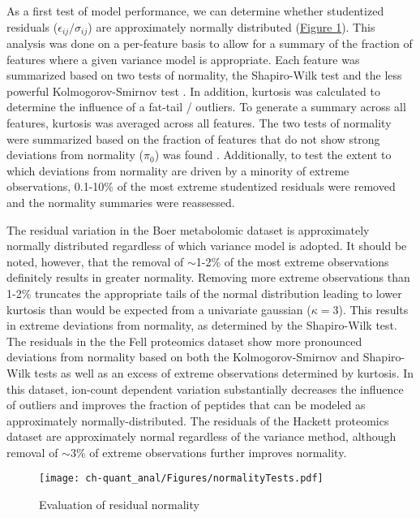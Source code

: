 As a first test of model performance, we can determine whether studentized residuals ($\epsilon_{ij} / \sigma_{ij}$) are approximately normally distributed (\hyperref[ch-quant_anal:normalityTests]{Figure \ref{ch-quant_anal:normalityTests}}). This analysis was done on a per-feature basis to allow for a summary of the fraction of features where a given variance model is appropriate. Each feature was summarized based on two tests of normality, the Shapiro-Wilk test \cite{Shapiro:1965gf} and the less powerful Kolmogorov-Smirnov test \cite{Lilliefors:1967bh}. In addition, kurtosis was calculated to determine the influence of a fat-tail / outliers. To generate a summary across all features, kurtosis was averaged across all features. The two tests of normality were summarized based on the fraction of features that do not show strong deviations from normality ($\pi_{0}$) was found \cite{Storey:2003cj}. Additionally, to test the extent to which deviations from normality are driven by a minority of extreme observations, 0.1-10\% of the most extreme studentized residuals were removed and the normality summaries were reassessed.

The residual variation in the Boer metabolomic dataset is approximately normally distributed regardless of which variance model is adopted. It should be noted, however, that the removal of $\sim$1-2\% of the most extreme observations definitely results in greater normality.  Removing more extreme observations than 1-2\% truncates the appropriate tails of the normal distribution leading to lower kurtosis than would be expected from a univariate gaussian ($\kappa = 3$). This results in extreme deviations from normality, as determined by the Shapiro-Wilk test. The residuals in the the Fell proteomics dataset show more pronounced deviations from normality based on both the Kolmogorov-Smirnov and Shapiro-Wilk tests as well as an excess of extreme observations determined by kurtosis. In this dataset, ion-count dependent variation substantially decreases the influence of outliers and improves the fraction of peptides that can be modeled as approximately normally-distributed. The residuals of the Hackett proteomics dataset are approximately normal regardless of the variance method, although removal of $\sim$3\% of extreme observations further improves normality.

\begin{figure}[h!]
\begin{center}
\texttt{[image: ch-quant\_anal/Figures/normalityTests.pdf]}
\caption[Evaluation of residual normality]{Evaluation of residual normality}
\label{ch-quant_anal:normalityTests}
\end{center}
\end{figure}

